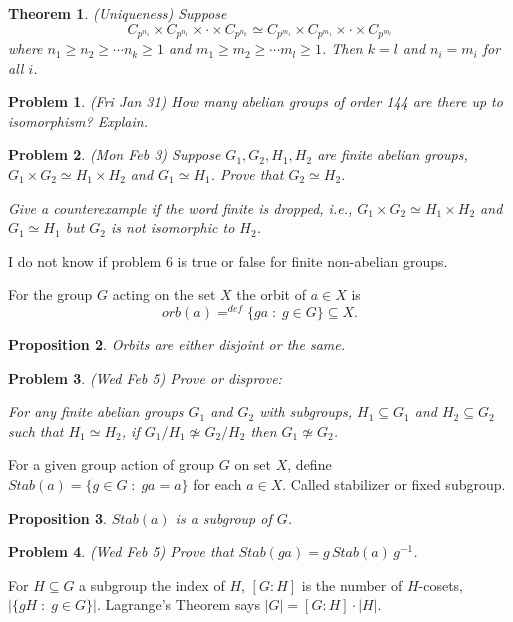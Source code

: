 \documentclass[12pt]{article}
\def\isom{\simeq}
\def\su{\subseteq}
\def\st{\;:\;}
\newtheorem{theorem}{Theorem}
\newtheorem{prop}[theorem]{Proposition}
\newtheorem{prob}{Problem}
\begin{document}
\begin{theorem}(Uniqueness)
Suppose 
$$C_{p^{n_1}}\times C_{p^{n_1}}\times\cdot\times C_{p^{n_k}}\isom
C_{p^{m_1}}\times C_{p^{m_1}}\times\cdot\times C_{p^{m_l}}$$
where $n_1\geq n_2\geq \cdots n_k\geq 1$ and 
$m_1\geq m_2\geq \cdots m_l\geq 1$.  Then $k=l$ and $n_i=m_i$ for
all $i$.
\end{theorem}

\begin{prob}(Fri Jan 31)
How many abelian groups of order 144 are there up to isomorphism?
Explain.
\end{prob}

\begin{prob}
(Mon Feb 3) Suppose $G_1,G_2,H_1,H_2$ are finite abelian groups,
$G_1\times G_2\isom H_1\times H_2$ and $G_1\isom H_1$.
Prove that $G_2\isom H_2$.
\par Give a counterexample if the word finite is dropped, i.e.,
$G_1\times G_2\isom H_1\times H_2$ and $G_1\isom H_1$ but $G_2$
is not isomorphic to $H_2$.   
\end{prob}

\noindent 
I do not know if problem 6 is true or false for finite non-abelian groups.

\bigskip
For the group $G$ acting on the set $X$
the orbit of $a\in X$ is
$$orb(a)=^{def}\{ga\st g\in G\}\su X.$$

\begin{prop} Orbits are either disjoint or the same.
\end{prop}

\begin{prob}
(Wed Feb 5) Prove or disprove:
\par For any finite abelian groups $G_1$ and $G_2$ with
subgroups, $H_1\su G_1$ and $H_2\su G_2$ such that $H_1\isom H_2$,
if $G_1/H_1\not\isom G_2/H_2$ then $G_1\not\isom G_2$.
\end{prob}

For a given group action of group $G$ on set
$X$, define $Stab(a)=\{g\in G\st ga=a\}$ for each $a\in X$.
Called stabilizer or fixed subgroup.

\begin{prop}
$Stab(a)$ is a subgroup of $G$.
\end{prop}

\begin{prob}
(Wed Feb 5) Prove that $Stab(ga)=g\,Stab(a)\,g^{-1}$.
\end{prob}

For $H\su G$ a subgroup the index of $H$, $[G:H]$ is the
number of $H$-cosets, $|\{gH\st g\in G\}|$.  Lagrange's
Theorem says $|G|=[G:H]\cdot |H|$.
\end{document}

